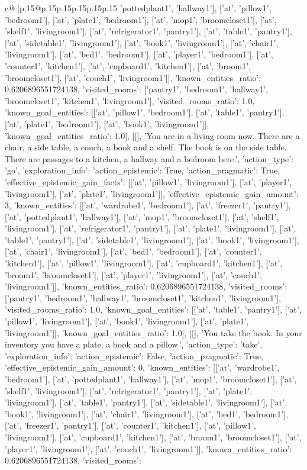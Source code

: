 \documentclass{article}
\begin{document}
{\begin{supertabular}{c@{$\;$}|p{.15\linewidth}@{}p{.15\linewidth}p{.15\linewidth}p{.15\linewidth}p{.15\linewidth}p{.15\linewidth}}
{{{'pottedplant1', 'hallway1'], ['at', 'pillow1', 'bedroom1'], ['at', 'plate1', 'bedroom1'], ['at', 'mop1', 'broomcloset1'], ['at', 'shelf1', 'livingroom1'], ['at', 'refrigerator1', 'pantry1'], ['at', 'table1', 'pantry1'], ['at', 'sidetable1', 'livingroom1'], ['at', 'book1', 'livingroom1'], ['at', 'chair1', 'livingroom1'], ['at', 'bed1', 'bedroom1'], ['at', 'player1', 'bedroom1'], ['at', 'counter1', 'kitchen1'], ['at', 'cupboard1', 'kitchen1'], ['at', 'broom1', 'broomcloset1'], ['at', 'couch1', 'livingroom1']], 'known_entities_ratio': 0.6206896551724138, 'visited_rooms': ['pantry1', 'bedroom1', 'hallway1', 'broomcloset1', 'kitchen1', 'livingroom1'], 'visited_rooms_ratio': 1.0, 'known_goal_entities': [['at', 'pillow1', 'bedroom1'], ['at', 'table1', 'pantry1'], ['at', 'plate1', 'bedroom1'], ['at', 'book1', 'livingroom1']], 'known_goal_entities_ratio': 1.0}}], [[], 'You are in a living room now. There are a chair, a side table, a couch, a book and a shelf. The book is on the side table. There are passages to a kitchen, a hallway and a bedroom here.', {'action_type': 'go', 'exploration_info': {'action_epistemic': True, 'action_pragmatic': True, 'effective_epistemic_gain_facts': [['at', 'pillow1', 'livingroom1'], ['at', 'player1', 'livingroom1'], ['at', 'plate1', 'livingroom1']], 'effective_epistemic_gain_amount': 3, 'known_entities': [['at', 'wardrobe1', 'bedroom1'], ['at', 'freezer1', 'pantry1'], ['at', 'pottedplant1', 'hallway1'], ['at', 'mop1', 'broomcloset1'], ['at', 'shelf1', 'livingroom1'], ['at', 'refrigerator1', 'pantry1'], ['at', 'plate1', 'livingroom1'], ['at', 'table1', 'pantry1'], ['at', 'sidetable1', 'livingroom1'], ['at', 'book1', 'livingroom1'], ['at', 'chair1', 'livingroom1'], ['at', 'bed1', 'bedroom1'], ['at', 'counter1', 'kitchen1'], ['at', 'pillow1', 'livingroom1'], ['at', 'cupboard1', 'kitchen1'], ['at', 'broom1', 'broomcloset1'], ['at', 'player1', 'livingroom1'], ['at', 'couch1', 'livingroom1']], 'known_entities_ratio': 0.6206896551724138, 'visited_rooms': ['pantry1', 'bedroom1', 'hallway1', 'broomcloset1', 'kitchen1', 'livingroom1'], 'visited_rooms_ratio': 1.0, 'known_goal_entities': [['at', 'table1', 'pantry1'], ['at', 'pillow1', 'livingroom1'], ['at', 'book1', 'livingroom1'], ['at', 'plate1', 'livingroom1']], 'known_goal_entities_ratio': 1.0}}], [[], 'You take the book. In your inventory you have a plate, a book and a pillow.', {'action_type': 'take', 'exploration_info': {'action_epistemic': False, 'action_pragmatic': True, 'effective_epistemic_gain_amount': 0, 'known_entities': [['at', 'wardrobe1', 'bedroom1'], ['at', 'pottedplant1', 'hallway1'], ['at', 'mop1', 'broomcloset1'], ['at', 'shelf1', 'livingroom1'], ['at', 'refrigerator1', 'pantry1'], ['at', 'plate1', 'livingroom1'], ['at', 'table1', 'pantry1'], ['at', 'sidetable1', 'livingroom1'], ['at', 'book1', 'livingroom1'], ['at', 'chair1', 'livingroom1'], ['at', 'bed1', 'bedroom1'], ['at', 'freezer1', 'pantry1'], ['at', 'counter1', 'kitchen1'], ['at', 'pillow1', 'livingroom1'], ['at', 'cupboard1', 'kitchen1'], ['at', 'broom1', 'broomcloset1'], ['at', 'player1', 'livingroom1'], ['at', 'couch1', 'livingroom1']], 'known_entities_ratio': 0.6206896551724138, 'visited_rooms': }}}
\end{supertabular}}
\end{document}
